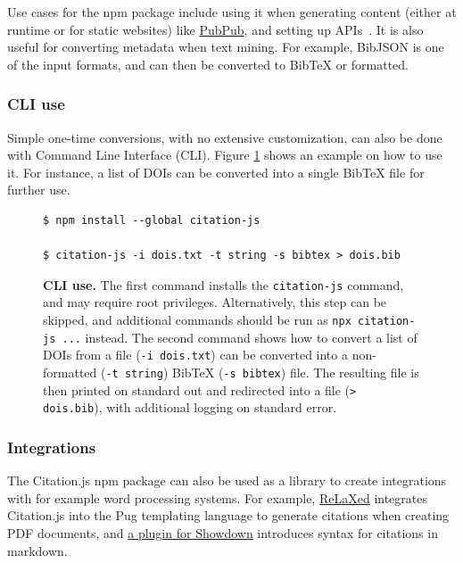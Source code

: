 \documentclass[fleqn,10pt,lineno]{wlpeerj} %
\begin{document}
Use cases for the npm package include using it when generating content (either at runtime or for static websites) like \href{https://www.pubpub.org/}{PubPub}, and setting up APIs~\citep{willighagen_citation.js:_2017}. It is also useful for converting metadata when text mining. For example, BibJSON is one of the input formats, and can then be converted to BibTeX or formatted.

\subsubsection*{CLI use}

Simple one-time conversions, with no extensive customization, can also be done with Command Line Interface (CLI). Figure \ref{code:cli} shows an example on how to use it. For instance, a list of DOIs can be converted into a single BibTeX file for further use.

\begin{figure}[ht]
\centering
\begin{verbatim}
$ npm install --global citation-js

$ citation-js -i dois.txt -t string -s bibtex > dois.bib
\end{verbatim}
\caption{\textbf{CLI use.}
The first command installs the \texttt{citation-js} command, and may require root privileges. Alternatively, this step can be skipped, and additional commands should be run as \texttt{npx citation-js ...} instead. The second command shows how to convert a list of DOIs from a file (\texttt{-i dois.txt}) can be converted into a non-formatted (\texttt{-t string}) BibTeX (\texttt{-s bibtex}) file. The resulting file is then printed on standard out and redirected into a file (\texttt{> dois.bib}), with additional logging on standard error.
}
\label{code:cli}
\end{figure}

\subsubsection*{Integrations}

The Citation.js npm package can also be used as a library to create integrations with for example word processing systems. For example, \href{https://github.com/RelaxedJS/ReLaXed}{ReLaXed} integrates Citation.js into the Pug templating language to generate citations when creating PDF documents, and \href{https://github.com/larsgw/citation.js-showdown}{a plugin for Showdown} introduces syntax for citations in markdown.
\end{document}
